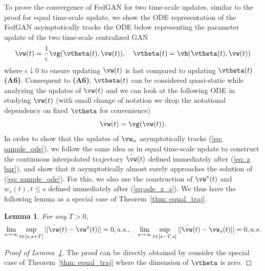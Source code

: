 \documentclass{article}
\newtheorem{lemma}{Lemma}
\def\lemref#1{Lemma~\ref{#1}}
\def\thmref#1{Theorem~\ref{#1}}
\begin{document}
	
	To prove the convergence of FedGAN for two time-scale updates, similar to the proof for equal time-scale update, we show the ODE representation of the FedGAN asymptotically tracks the ODE below representing the parameter update of the two time-scale centralized GAN
	\begin{equation}
	\label{eq:ode_2_w}
	\dot{{\vw}}(t) = \frac{1}{\epsilon}{\vg}(\vtheta(t), {\vw}(t)),\quad
	\dot{{\vtheta}}(t) = {\vh}(\vtheta(t), {\vw}(t))
	\end{equation}
    where $\epsilon \downarrow 0$ to ensure updating ${\vw}(t)$ is fast compared to updating $\vtheta(t)$  \textbf{(A6)}. Consequent to \textbf{(A6)},  $\vtheta(t)$ can be considered quasi-static while analyzing the updates of ${\vw}(t)$ and we can look at the following ODE in studying ${\vw}(t)$ (with small change of notation we drop the notational dependency on fixed $\vtheta$ for convenience) 
	\begin{equation}
	\dot{{\vw}}(t) = {\vg}({\vw}(t)).
	\label{eq: sample_ode}
	\end{equation}
	In order to show that the updates of ${\vw}_n$ asymptotically tracks (\ref{eq: sample_ode}), we follow the same idea as in equal time-scale update to construct the continuous interpolated trajectory $\bar{\vw}(t)$ defined immediately after (\ref{eq: z bar}), and show that it asymptotically almost surely approaches the solution of (\ref{eq: sample_ode}). For this, we also use the construction of $\vw^s(t)$ and $w_s(t), t\leq s$ defined immediately after (\ref{eq:ode_z_s}). We thus have the following lemma as a special case of \thmref{thm: equal_traj}.
	\begin{lemma}
		\label{lem: asym_traj}
		For any $T>0$,
		\begin{equation} 
		\lim_{s\rightarrow \infty} \sup_{t\in [s,s+T]} ||\bar{\vw}(t)-\vw^s(t)|| = 0, a.s.,\quad
		\lim_{s\rightarrow \infty} \sup_{t\in [s-T,s]} ||\bar{\vw}(t)-\vw_s(t)|| = 0, a.s.
		\end{equation}
	\end{lemma}
	
	\begin{proof}[Proof of \lemref{lem: asym_traj}]
		The proof can be directly obtained by consider the special case of \thmref{thm: equal_traj} where the dimension of $\vtheta$ is zero.
	\end{proof}
	
\end{document}

